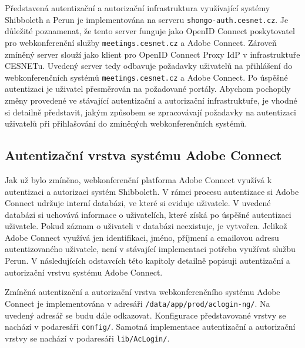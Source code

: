 \documentclass[
  printed, %
  twoside, %
  table,   %
  nolof,     %
  nolot,     %
]{fithesis3}
\begin{document}
Představená autentizační a autorizační infrastruktura využívající systémy Shibboleth a Perun je implementována na serveru \texttt{shongo-auth.cesnet.cz}. Je důležité poznamenat, že tento server funguje jako OpenID Connect poskytovatel pro webkonferenční služby \texttt{meetings.cesnet.cz} a Adobe Connect. Zároveň zmíněný server slouží jako klient pro OpenID Connect Proxy IdP v infrastruktuře CESNETu. Uvedený server tedy odbavuje požadavky uživatelů na přihlášení do webkonferenčních systémů \texttt{meetings.cesnet.cz} a Adobe Connect. Po úspěšné autentizaci je uživatel přesměrován na požadované portály. Abychom pochopily změny provedené ve stávající autentizační a autorizační infrastruktuře, je vhodné si detailně představit, jakým způsobem se zpracovávají požadavky na autentizaci uživatelů při přihlašování do zmíněných webkonferenčních systémů.  

\subsection{Autentizační vrstva systému Adobe Connect}
\label{ac-old}
Jak už bylo zmíněno, webkonferenční platforma Adobe Connect využívá k autentizaci a
autorizaci systém Shibboleth. V rámci procesu autentizace si Adobe Connect udržuje interní databázi, ve které si eviduje uživatele. V
uvedené databázi si uchovává informace o uživatelích,
které získá po úspěšné autentizaci uživatele. Pokud záznam o uživateli
v databázi neexistuje, je vytvořen. Jelikož Adobe Connect využívá jen
identifikaci, jméno, příjmení a emailovou adresu autentizovaného uživatele, není v stávající implementaci
potřeba využívat službu Perun. V následujících odstavcích této kapitoly detailně popisuji autentizační a autorizační vrstvu systému Adobe Connect. \par

Zmíněná autentizační a autorizační vrstva webkonferenčního systému Adobe Connect je implementována v adresáři \texttt{/data/app/prod/aclogin-ng/}. Na uvedený adresář se budu dále odkazovat. Konfigurace představované vrstvy se nachází v podaresáři \texttt{config/}. Samotná implementace autentizační a autorizační vrstvy se nachází v podaresáři \texttt{lib/AcLogin/}. \par
\end{document}
